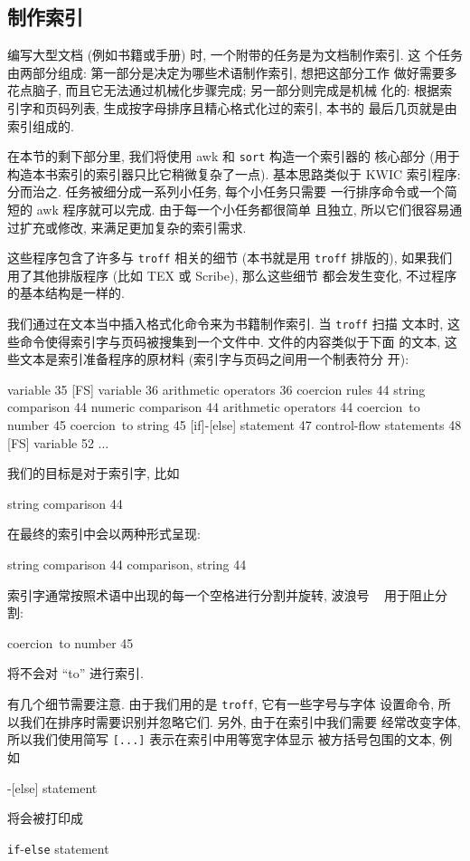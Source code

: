 \subsection{制作索引}
\label{subsec:making_indexes}

编写大型文档 (例如书籍或手册) 时, 一个附带的任务是为文档制作索引. 这
个任务由两部分组成: 第一部分是决定为哪些术语制作索引, 想把这部分工作
做好需要多花点脑子, 而且它无法通过机械化步骤完成; 另一部分则完成是机械
化的: 根据索引字和页码列表, 生成按字母排序且精心格式化过的索引, 本书的
最后几页就是由索引组成的.

在本节的剩下部分里, 我们将使用 awk 和 \texttt{sort} 构造一个索引器的
核心部分 (用于构造本书索引的索引器只比它稍微复杂了一点). 基本思路类似于
KWIC 索引程序: 分而治之. 任务被细分成一系列小任务, 每个小任务只需要
一行排序命令或一个简短的 awk 程序就可以完成. 由于每一个小任务都很简单
且独立, 所以它们很容易通过扩充或修改, 来满足更加复杂的索引需求.

这些程序包含了许多与 \texttt{troff} 相关的细节 (本书就是用 \texttt{troff}
排版的), 如果我们用了其他排版程序 (比如 TEX 或 Scribe), 那么这些细节
都会发生变化, 不过程序的基本结构是一样的.

我们通过在文本当中插入格式化命令来为书籍制作索引. 当 \texttt{troff} 扫描 
文本时, 这些命令使得索引字与页码被搜集到一个文件中. 文件的内容类似于下面
的文本, 这些文本是索引准备程序的原材料 (索引字与页码之间用一个制表符分
开):
%
\begin{file}
    [FS] variable	35
    [FS] variable	36
    arithmetic operators	36
    coercion rules	44
    string comparison	44
    numeric comparison	44
    arithmetic operators	44
    coercion~to number	45
    coercion~to string	45
    [if]-[else] statement	47
    control-flow statements	48
    [FS] variable	52
    ...
\end{file}
我们的目标是对于索引字, 比如 
\begin{file}
    string comparison       44
\end{file}
在最终的索引中会以两种形式呈现:
\begin{file}
    string comparison 44
    comparison, string 44
\end{file}
索引字通常按照术语中出现的每一个空格进行分割并旋转, 波浪号 \texttt{~}
用于阻止分割:
\begin{file}
    coercion~to number      45
\end{file}
将不会对 ``to'' 进行索引.

有几个细节需要注意. 由于我们用的是 \texttt{troff}, 它有一些字号与字体
设置命令, 所以我们在排序时需要识别并忽略它们. 另外, 由于在索引中我们需要
经常改变字体, 所以我们使用简写 \texttt{[...]} 表示在索引中用等宽字体显示
被方括号包围的文本, 例如 
\begin{file}
    [if]-[else] statement
\end{file}
将会被打印成
\begin{pattern}
    \texttt{if}-\texttt{else} statement
\end{pattern}

